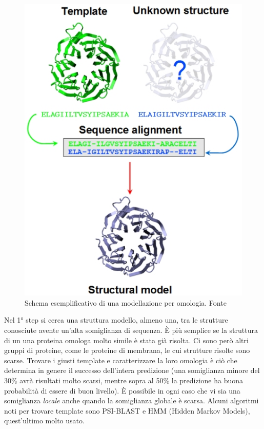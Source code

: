 \begin{figure}[!htb]
	\label{fig:omologia-flusso}
	\endminipage\hfill
	\centering
	\includegraphics[scale=0.5]{images/homology2.jpg}
	\caption{Schema esemplificativo di una modellazione per omologia. Fonte \cite{UNIL-homology}}
	\label{fig:omologia-esempio}
	\endminipage\hfill
\end{figure}

Nel 1° step si cerca una struttura modello, almeno una, tra le strutture conosciute avente un'alta somiglianza di sequenza. È più semplice se la struttura di un una proteina omologa molto simile è stata già risolta. Ci sono però altri gruppi di proteine, come le proteine di membrana, le cui strutture risolte sono scarse. Trovare i giusti template e caratterizzare la loro omologia è ciò che determina in genere il successo dell'intera predizione (una somiglianza minore del 30\% avrà risultati molto scarsi, mentre sopra al 50\% la predizione ha buona probabilità di essere di buon livello). È possibile in ogni caso che vi sia una somiglianza \textit{locale} anche quando la somiglianza globale è scarsa. Alcuni algoritmi noti per trovare template sono PSI-BLAST e HMM (Hidden Markov Models), quest'ultimo molto usato.

